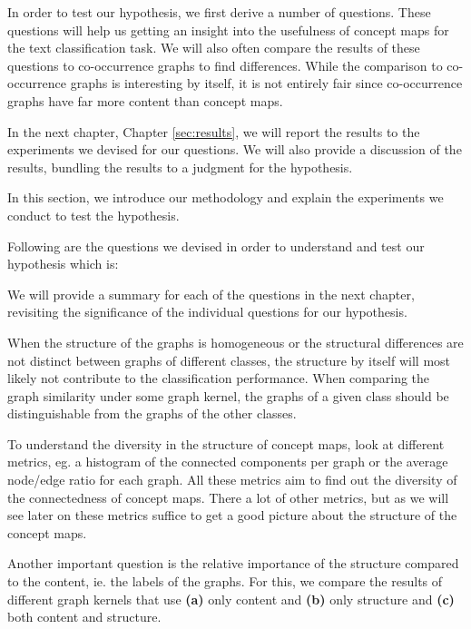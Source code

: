 In order to test our hypothesis, we first derive a number of questions.
These questions will help us getting an insight into the usefulness of concept maps for the text classification task.
We will also often compare the results of these questions to co-occurrence graphs to find differences. While the comparison to co-occurrence graphs is interesting by itself, it is not entirely fair since co-occurrence graphs have far more content than concept maps.

In the next chapter, Chapter \ref{sec:results}, we will report the results to the experiments we devised for our questions.
We will also provide a discussion of the results, bundling the results to a judgment for the hypothesis.

In this section, we introduce our methodology and explain the experiments we conduct to test the hypothesis.

Following are the questions we devised in order to understand and test our hypothesis which is:
\begin{quote}\hypothesis\end{quote}

We will provide a summary for each of the questions in the next chapter, revisiting the significance of the individual questions for our hypothesis.


When the structure of the graphs is homogeneous or the structural differences are not distinct between graphs of different classes, the structure by itself will most likely not contribute to the classification performance.
When comparing the graph similarity under some graph kernel, the graphs of a given class should be distinguishable from the graphs of the other classes.

To understand the diversity in the structure of concept maps, look at different metrics, eg. a histogram of the connected components per graph or the average node/edge ratio for each graph.
All these metrics aim to find out the diversity of the connectedness of concept maps. There a lot of other metrics, but as we will see later on these metrics suffice to get a good picture about the structure of the concept maps.

Another important question is the relative importance of the structure compared to the content, ie. the labels of the graphs.
For this, we compare the results of different graph kernels that use \textbf{(a)} only content and \textbf{(b)} only structure and \textbf{(c)} both content and structure.


